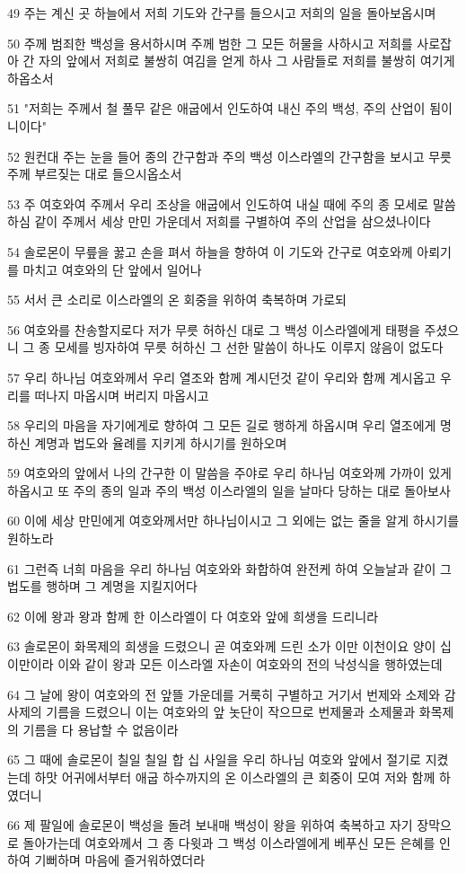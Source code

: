 \par 49 주는 계신 곳 하늘에서 저희 기도와 간구를 들으시고 저희의 일을 돌아보옵시며
\par 50 주께 범죄한 백성을 용서하시며 주께 범한 그 모든 허물을 사하시고 저희를 사로잡아 간 자의 앞에서 저희로 불쌍히 여김을 얻게 하사 그 사람들로 저희를 불쌍히 여기게 하옵소서
\par 51 "저희는 주께서 철 풀무 같은 애굽에서 인도하여 내신 주의 백성, 주의 산업이 됨이니이다"
\par 52 원컨대 주는 눈을 들어 종의 간구함과 주의 백성 이스라엘의 간구함을 보시고 무릇 주께 부르짖는 대로 들으시옵소서
\par 53 주 여호와여 주께서 우리 조상을 애굽에서 인도하여 내실 때에 주의 종 모세로 말씀하심 같이 주께서 세상 만민 가운데서 저희를 구별하여 주의 산업을 삼으셨나이다
\par 54 솔로몬이 무릎을 꿇고 손을 펴서 하늘을 향하여 이 기도와 간구로 여호와께 아뢰기를 마치고 여호와의 단 앞에서 일어나
\par 55 서서 큰 소리로 이스라엘의 온 회중을 위하여 축복하며 가로되
\par 56 여호와를 찬송할지로다 저가 무릇 허하신 대로 그 백성 이스라엘에게 태평을 주셨으니 그 종 모세를 빙자하여 무릇 허하신 그 선한 말씀이 하나도 이루지 않음이 없도다
\par 57 우리 하나님 여호와께서 우리 열조와 함께 계시던것 같이 우리와 함께 계시옵고 우리를 떠나지 마옵시며 버리지 마옵시고
\par 58 우리의 마음을 자기에게로 향하여 그 모든 길로 행하게 하옵시며 우리 열조에게 명하신 계명과 법도와 율례를 지키게 하시기를 원하오며
\par 59 여호와의 앞에서 나의 간구한 이 말씀을 주야로 우리 하나님 여호와께 가까이 있게 하옵시고 또 주의 종의 일과 주의 백성 이스라엘의 일을 날마다 당하는 대로 돌아보사
\par 60 이에 세상 만민에게 여호와께서만 하나님이시고 그 외에는 없는 줄을 알게 하시기를 원하노라
\par 61 그런즉 너희 마음을 우리 하나님 여호와와 화합하여 완전케 하여 오늘날과 같이 그 법도를 행하며 그 계명을 지킬지어다
\par 62 이에 왕과 왕과 함께 한 이스라엘이 다 여호와 앞에 희생을 드리니라
\par 63 솔로몬이 화목제의 희생을 드렸으니 곧 여호와께 드린 소가 이만 이천이요 양이 십 이만이라 이와 같이 왕과 모든 이스라엘 자손이 여호와의 전의 낙성식을 행하였는데
\par 64 그 날에 왕이 여호와의 전 앞뜰 가운데를 거룩히 구별하고 거기서 번제와 소제와 감사제의 기름을 드렸으니 이는 여호와의 앞 놋단이 작으므로 번제물과 소제물과 화목제의 기름을 다 용납할 수 없음이라
\par 65 그 때에 솔로몬이 칠일 칠일 합 십 사일을 우리 하나님 여호와 앞에서 절기로 지켰는데 하맛 어귀에서부터 애굽 하수까지의 온 이스라엘의 큰 회중이 모여 저와 함께 하였더니
\par 66 제 팔일에 솔로몬이 백성을 돌려 보내매 백성이 왕을 위하여 축복하고 자기 장막으로 돌아가는데 여호와께서 그 종 다윗과 그 백성 이스라엘에게 베푸신 모든 은혜를 인하여 기뻐하며 마음에 즐거워하였더라

